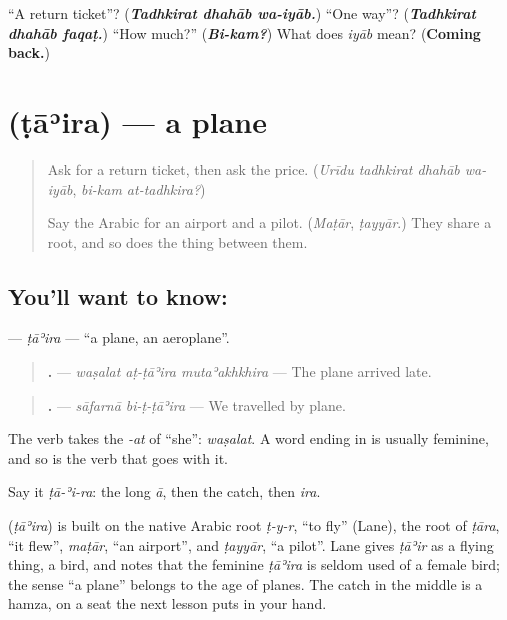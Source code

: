 \begin{tcolorbox}[breakable,colback=teal!4,colframe=teal!35!black,title={Before you move on}]
\textquotedblleft{}A return ticket\textquotedblright{}? (\emph{\textbf{Tadhkirat dhahāb wa-iyāb.}}) \textquotedblleft{}One way\textquotedblright{}? (\emph{\textbf{Tadhkirat dhahāb faqaṭ.}}) \textquotedblleft{}How much?\textquotedblright{} (\emph{\textbf{Bi-kam?}}) What does \emph{iyāb} mean? (\textbf{Coming back.})
\end{tcolorbox}
\section[\texorpdfstring{\ar{طائرة} (ṭāʾira)}{طائرة (ṭāʾira)}]{ (ṭāʾira) — a plane}

\label{lesson:AR-C288-taira}



\begin{quote}
Ask for a return ticket, then ask the price. (\emph{Urīdu tadhkirat dhahāb wa-iyāb}, \emph{bi-kam at-tadhkira?})

Say the Arabic for an airport and a pilot. (\emph{Maṭār}, \emph{ṭayyār}.) They share a root, and so does the thing between them.
\end{quote}

\subsection*{You'll want to know: }
\textbf{} — \emph{ṭāʾira} — \textquotedblleft{}a plane, an aeroplane\textquotedblright{}.

\begin{quote}
\textbf{  .} — \emph{waṣalat aṭ-ṭāʾira mutaʾakhkhira} — The plane arrived late.
\end{quote}

\begin{quote}
\textbf{ .} — \emph{sāfarnā bi-ṭ-ṭāʾira} — We travelled by plane.
\end{quote}

The verb takes the \emph{-at} of \textquotedblleft{}she\textquotedblright{}: \emph{waṣalat}. A word ending in \textbf{} is usually feminine, and so is the verb that goes with it.

Say it \emph{ṭā-ʾi-ra}: the long \emph{ā}, then the catch, then \emph{ira}.

\begin{cousinweb}
\textbf{} (\emph{ṭāʾira}) is built on the native Arabic root \emph{ṭ-y-r}, \textquotedblleft{}to fly\textquotedblright{} (Lane), the root of \emph{ṭāra}, \textquotedblleft{}it flew\textquotedblright{}, \emph{maṭār}, \textquotedblleft{}an airport\textquotedblright{}, and \emph{ṭayyār}, \textquotedblleft{}a pilot\textquotedblright{}. Lane gives \emph{ṭāʾir} as a flying thing, a bird, and notes that the feminine \emph{ṭāʾira} is seldom used of a female bird; the sense \textquotedblleft{}a plane\textquotedblright{} belongs to the age of planes. The catch in the middle is a hamza, on a seat the next lesson puts in your hand.
\end{cousinweb}

